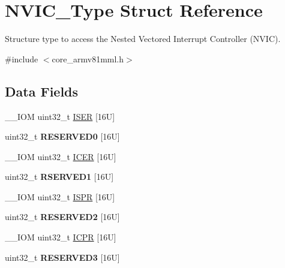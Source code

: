 \hypertarget{struct_n_v_i_c___type}{}\section{N\+V\+I\+C\+\_\+\+Type Struct Reference}
\label{struct_n_v_i_c___type}


Structure type to access the Nested Vectored Interrupt Controller (N\+V\+IC).  




{\ttfamily \#include $<$core\+\_\+armv81mml.\+h$>$}

\subsection*{Data Fields}
\begin{DoxyCompactItemize}
\item 
\+\_\+\+\_\+\+I\+OM uint32\+\_\+t \mbox{\hyperlink{struct_n_v_i_c___type_a040b60157eb7348b9325cb804333c48f}{I\+S\+ER}} \mbox{[}16\+U\mbox{]}
\item 
\mbox{\label{struct_n_v_i_c___type_a4e715edc749310cecbc19fa91c81fc7f}} 
uint32\+\_\+t {\bfseries R\+E\+S\+E\+R\+V\+E\+D0} \mbox{[}16\+U\mbox{]}
\item 
\+\_\+\+\_\+\+I\+OM uint32\+\_\+t \mbox{\hyperlink{struct_n_v_i_c___type_ae7aedd01fc75b7b98c6ef887cc21245b}{I\+C\+ER}} \mbox{[}16\+U\mbox{]}
\item 
\mbox{\label{struct_n_v_i_c___type_a3323ebb4ecad890dcf5e5dc126205312}} 
uint32\+\_\+t {\bfseries R\+S\+E\+R\+V\+E\+D1} \mbox{[}16\+U\mbox{]}
\item 
\+\_\+\+\_\+\+I\+OM uint32\+\_\+t \mbox{\hyperlink{struct_n_v_i_c___type_a19081cde0360514d37cefa9b5fdfc0fe}{I\+S\+PR}} \mbox{[}16\+U\mbox{]}
\item 
\mbox{\label{struct_n_v_i_c___type_a7743c8252af4b0bd8a8440f66d859cf5}} 
uint32\+\_\+t {\bfseries R\+E\+S\+E\+R\+V\+E\+D2} \mbox{[}16\+U\mbox{]}
\item 
\+\_\+\+\_\+\+I\+OM uint32\+\_\+t \mbox{\hyperlink{struct_n_v_i_c___type_af27404125e8333bfac9a13da10f924ca}{I\+C\+PR}} \mbox{[}16\+U\mbox{]}
\item 
\mbox{\label{struct_n_v_i_c___type_aa4bffe09d298bc1210833fde1d290086}} 
uint32\+\_\+t {\bfseries R\+E\+S\+E\+R\+V\+E\+D3} \mbox{[}16\+U\mbox{]}

\end{DoxyCompactItemize}
